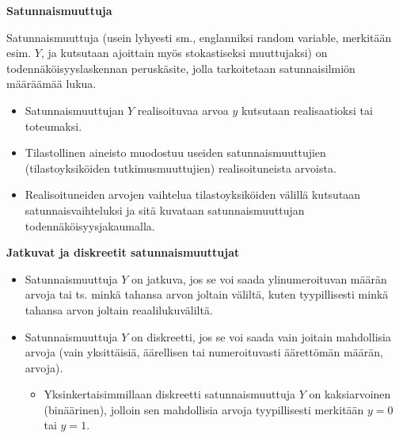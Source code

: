 \documentclass[
]{book}
\providecommand{\tightlist}{%
  \setlength{\itemsep}{0pt}\setlength{\parskip}{0pt}}
\begin{document}
\begin{defblock}{}

\textbf{Satunnaismuuttuja}

Satunnaismuuttuja (usein lyhyesti sm., englanniksi random variable, merkitään esim. \(Y\), ja kutsutaan ajoittain myös stokastiseksi muuttujaksi) on todennäköisyyslaskennan peruskäsite, jolla tarkoitetaan satunnaisilmiön määräämää lukua.

\begin{itemize}
\item
  Satunnaismuuttujan \(Y\) realisoituvaa arvoa \(y\) kutsutaan realisaatioksi tai toteumaksi.
\item
  Tilastollinen aineisto muodostuu useiden satunnaismuuttujien (tilastoyksiköiden tutkimusmuuttujien) realisoituneista arvoista.
\item
  Realisoituneiden arvojen vaihtelua tilastoyksiköiden välillä kutsutaan satunnaisvaihteluksi ja sitä kuvataan satunnaismuuttujan todennäköisyysjakaumalla.
\end{itemize}

\end{defblock}

\begin{defblock}{}

\textbf{Jatkuvat ja diskreetit satunnaismuuttujat}

\begin{itemize}
\tightlist
\item
  Satunnaismuuttuja \(Y\) on jatkuva, jos se voi saada ylinumeroituvan määrän arvoja tai ts. minkä tahansa arvon joltain väliltä, kuten tyypillisesti minkä tahansa arvon joltain reaalilukuväliltä.
\item
  Satunnaismuuttuja \(Y\) on diskreetti, jos se voi saada vain joitain mahdollisia arvoja (vain yksittäisiä, äärellisen tai numeroituvasti äärettömän määrän, arvoja).

  \begin{itemize}
  \tightlist
  \item
    Yksinkertaisimmillaan diskreetti satunnaismuuttuja \(Y\) on kaksiarvoinen (binäärinen), jolloin sen mahdollisia arvoja tyypillisesti merkitään \(y=0\) tai \(y=1\).
  \end{itemize}
\end{itemize}

\end{defblock}
\end{document}
